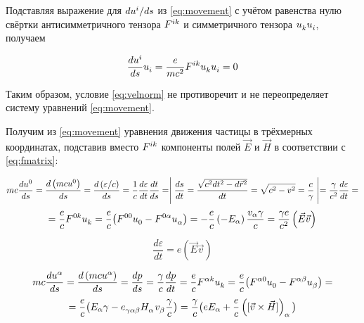 \documentclass{article}
\begin{document}
Подставляя выражение для $d\tensor{u}{^i}/ds$ из \eqref{eq:movement} с учётом равенства нулю свёртки антисимметричного тензора $\tensor{F}{^i^k}$ и симметричного тензора $\tensor{u}{_k}\tensor{u}{_i}$, получаем

\begin{equation*}
    \frac{d\tensor{u}{^i}}{ds}\tensor{u}{_i}=\frac{e}{mc^2}\tensor{F}{^i^k}\tensor{u}{_k}\tensor{u}{_i}=0 
\end{equation*}

Таким образом, условие \eqref{eq:velnorm} не противоречит и не переопределяет систему уравнений \eqref{eq:movement}.

Получим из \eqref{eq:movement} уравнения движения частицы в трёхмерных координатах, подставив вместо $\tensor{F}{^i^k}$ компоненты полей $\vec{E}$ и $\vec{H}$ в соответствии с \eqref{eq:fmatrix}:

\begin{equation*}
    mc\frac{d\tensor{u}{^0}}{ds}=\frac{d\left(mc\tensor{u}{^0}\right)}{ds}=\frac{d\left(\varepsilon/c\right)}{ds}=\frac{1}{c}\frac{d\varepsilon}{dt}\frac{dt}{ds}=\Biggm\lvert\frac{ds}{dt}=\frac{\sqrt{c^2dt^2-d\vec{r}^2}}{dt}=\sqrt{c^2-v^2}=\frac{c}{\gamma}\Biggm\rvert=\frac{\gamma}{c^2}\frac{d\varepsilon}{dt}=
\end{equation*}
\begin{equation*}
    =\frac{e}{c}\tensor{F}{^0^k}\tensor{u}{_k}=\frac{e}{c}\big(\tensor{F}{^0^0}\tensor{u}{_0}-\tensor{F}{^0^\alpha}\tensor{u}{_\alpha}\big)    =-\frac{e}{c}\left(-E_\alpha\right)\frac{v_\alpha\gamma}{c}=\frac{\gamma e}{c^2}\left(\vec{E}\vec{v}\right)
\end{equation*}

\begin{equation}\label{eq:emovement}
    \frac{d\varepsilon}{dt}=e\left(\vec{E}\vec{v}\right)
\end{equation}

\begin{equation*}
    mc\frac{d\tensor{u}{^\alpha}}{ds}=\frac{d\left(mc\tensor{u}{^\alpha}\right)}{ds}=\frac{dp}{ds}=\frac{\gamma}{c}\frac{dp}{dt}=\frac{e}{c}\tensor{F}{^\alpha^k}\tensor{u}{_k}=\frac{e}{c}\big(\tensor{F}{^\alpha^0}\tensor{u}{_0}-\tensor{F}{^\alpha^\beta}\tensor{u}{_\beta}\big)=
\end{equation*}
\begin{equation*}
    =\frac{e}{c}\big(E_\alpha\gamma-\tensor{e}{_\gamma_\alpha_\beta}\tensor{H}{_\alpha}\tensor{v}{_\beta}\frac{\gamma}{c}\big)=\frac{\gamma}{c}\big(eE_\alpha+\frac{e}{c}\left(\lbrack\vec{v}\times\vec{H}\rbrack\right)_\alpha\big)
\end{equation*}
\end{document}
